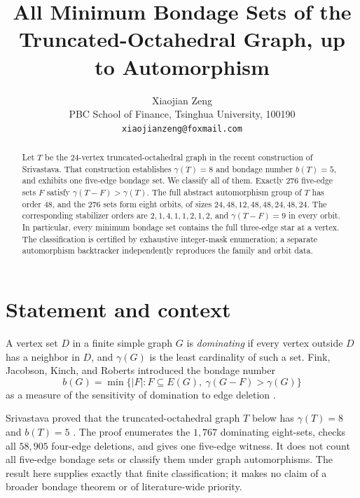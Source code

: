 \documentclass[11pt]{article}
\title{All Minimum Bondage Sets of the Truncated-Octahedral Graph, up to Automorphism}
\author{Xiaojian Zeng\\
PBC School of Finance, Tsinghua University, 100190\\
\texttt{xiaojianzeng@foxmail.com}}
\date{}
\begin{document}
\maketitle

\begin{abstract}
Let $T$ be the $24$-vertex truncated-octahedral graph in the recent
construction of Srivastava.  That construction establishes
$\gamma(T)=8$ and bondage number $b(T)=5$, and exhibits one five-edge
bondage set.  We classify all of them.  Exactly $276$ five-edge sets $F$
satisfy $\gamma(T-F)>\gamma(T)$.  The full abstract automorphism group of
$T$ has order $48$, and the $276$ sets form eight orbits, of sizes
$24,48,12,48,48,24,48,24$.  The corresponding stabilizer orders are
$2,1,4,1,1,2,1,2$, and $\gamma(T-F)=9$ in every orbit.  In particular,
every minimum bondage set contains the full three-edge star at a vertex.
The classification is certified by exhaustive integer-mask enumeration;
a separate automorphism backtracker independently reproduces the family
and orbit data.
\end{abstract}

\section{Statement and context}

A vertex set $D$ in a finite simple graph $G$ is \emph{dominating} if
every vertex outside $D$ has a neighbor in $D$, and $\gamma(G)$ is the
least cardinality of such a set.  Fink, Jacobson, Kinch, and Roberts
introduced the bondage number
\[
 b(G)=\min\{|F|:F\subseteq E(G),\ \gamma(G-F)>\gamma(G)\}
\]
as a measure of the sensitivity of domination to edge deletion
\cite{Fink1990Bondage}.

Srivastava proved that the truncated-octahedral graph $T$ below has
$\gamma(T)=8$ and $b(T)=5$ \cite{Srivastava2026Truncated}.  The proof
enumerates the $1{,}767$ dominating eight-sets, checks all $58{,}905$
four-edge deletions, and gives one five-edge witness.  It does not count
all five-edge bondage sets or classify them under graph automorphisms.
The result here supplies exactly that finite classification; it makes no
claim of a broader bondage theorem or of literature-wide priority.
\end{document}
